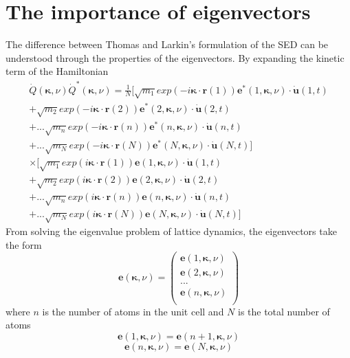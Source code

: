 \chapter{The importance of eigenvectors}

The difference between Thomas and Larkin's formulation of the SED can be understood through the properties of the eigenvectors. By expanding the kinetic term of the Hamiltonian
\begin{equation}
\begin{split}
\dot{Q}(\bm{\kappa},\nu)\dot{Q}^*(\bm{\kappa},\nu)=\frac{1}{N}[\sqrt{m_1}exp(-i\bm{\kappa}\cdot\bm{r}(1))\bm{e}^*(1,\bm{\kappa},\nu)\cdot\dot{\bm{u}}(1,t)\\
+\sqrt{m_2}exp(-i\bm{\kappa}\cdot\bm{r}(2))\bm{e}^*(2,\bm{\kappa},\nu)\cdot\dot{\bm{u}}(2,t)\\
+...\sqrt{m_n}exp(-i\bm{\kappa}\cdot\bm{r}(n))\bm{e}^*(n,\bm{\kappa},\nu)\cdot\dot{\bm{u}}(n,t)\\
+...\sqrt{m_N}exp(-i\bm{\kappa}\cdot\bm{r}(N))\bm{e}^*(N,\bm{\kappa},\nu)\cdot\dot{\bm{u}}(N,t)]\\
\times[\sqrt{m_1}exp(i\bm{\kappa}\cdot\bm{r}(1))\bm{e}(1,\bm{\kappa},\nu)\cdot\dot{\bm{u}}(1,t)\\
+\sqrt{m_2}exp(i\bm{\kappa}\cdot\bm{r}(2))\bm{e}(2,\bm{\kappa},\nu)\cdot\dot{\bm{u}}(2,t)\\
+...\sqrt{m_n}exp(i\bm{\kappa}\cdot\bm{r}(n))\bm{e}(n,\bm{\kappa},\nu)\cdot\dot{\bm{u}}(n,t)\\
+...\sqrt{m_N}exp(i\bm{\kappa}\cdot\bm{r}(N))\bm{e}(N,\bm{\kappa},\nu)\cdot\dot{\bm{u}}(N,t)]
\end{split}
\end{equation}
From solving the eigenvalue problem of lattice dynamics, the eigenvectors take the form
\begin{equation}
\bm{e}(\bm{\kappa},\nu)=
\begin{pmatrix}
\bm{e}(1,\bm{\kappa},\nu)\\
\bm{e}(2,\bm{\kappa},\nu)\\
...\\
\bm{e}(n,\bm{\kappa},\nu)\\
\end{pmatrix}
\end{equation}
where $n$ is the number of atoms in the unit cell and $N$ is the total number of atoms
\begin{equation}
\bm{e}(1,\bm{\kappa},\nu)=\bm{e}(n+1,\bm{\kappa},\nu)
\end{equation}
\begin{equation}
\bm{e}(n,\bm{\kappa},\nu)=\bm{e}(N,\bm{\kappa},\nu)
\end{equation}

